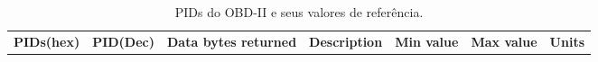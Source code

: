 \begin{table}[h]
    \caption{PIDs do OBD-II e seus valores de referência.}
    \label{Tb:tab2}
    \centering
    
    \begin{adjustbox}{width=\textwidth}
    
        \begin{tabular}{ccc p{6cm} ccc}
            \rowcolor[HTML]{C0C0C0} 
            
            {\color[HTML]{FFFFFF} \textbf{PIDs(hex)}} & {\color[HTML]{FFFFFF} \textbf{PID(Dec)}} & {\color[HTML]{FFFFFF} \textbf{Data bytes returned}} & {\color[HTML]{FFFFFF} \textbf{Description}} & {\color[HTML]{FFFFFF} \textbf{Min value}} & {\color[HTML]{FFFFFF} \textbf{Max value}} & {\color[HTML]{FFFFFF} \textbf{Units}} \\
            

\end{tabular}
\end{adjustbox}
\end{table}
